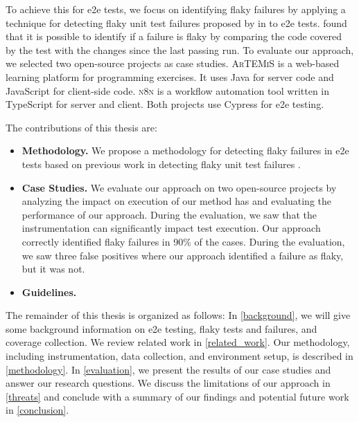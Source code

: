 To achieve this for \ac{e2e} tests, we focus on identifying flaky failures by applying a technique  for detecting flaky unit test failures proposed by \citeauthor*{bell_deflaker_2018} in  \autocite{bell_deflaker_2018} to \ac{e2e} tests.
 found that it is possible to identify if a failure is flaky by comparing the code covered by the test with the changes since the last passing run.
To evaluate our approach, we selected two open-source projects as case studies.
\textsc{ArTEMiS} \autocite{krusche_artemis_2018} is a web-based learning platform for programming exercises.
It uses Java for server code and JavaScript for client-side code.
\textsc{n8n} \autocite{noauthor_n8n_2023} is a workflow automation tool written in TypeScript for server and client.
Both projects use Cypress \autocite{noauthor_cypress-iocypress_2023} for \ac{e2e} testing.

The contributions of this thesis are:
\begin{itemize}
	\item \textbf{Methodology.} We propose a methodology  for detecting flaky failures in \ac{e2e} tests based on previous work in detecting flaky unit test failures \autocite{bell_deflaker_2018}.
	\item \textbf{Case Studies.} We evaluate our approach on two open-source projects by analyzing the impact on execution of our method has and evaluating the performance of our approach.
	      During the evaluation, we saw that the instrumentation can significantly impact test execution.
	      Our approach correctly identified flaky failures in 90\%  of the cases.
	      During the evaluation, we saw three  false positives where our approach identified a failure as flaky, but it was not.
	\item \textbf{Guidelines.} 
\end{itemize}

The remainder of this thesis is organized as follows:
In \cref{background}, we will give some background information on \ac{e2e} testing, flaky tests and failures, and coverage collection.
We review related work in \cref{related_work}.
Our methodology, including instrumentation, data collection, and environment setup, is described in \cref{methodology}.
In \cref{evaluation}, we present the results of our case studies and answer our research questions.
We discuss the limitations of our approach in \cref{threats} and conclude with a summary of our findings and potential future work in \cref{conclusion}.



